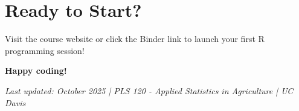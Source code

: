 \documentclass[11pt,a4paper]{article}
\begin{document}
\section{Ready to Start?}

Visit the course website or click the Binder link to launch your first R programming session!

\begin{center}
\textbf{Happy coding!}
\end{center}

\vfill

\begin{center}
\textit{Last updated: October 2025 | PLS 120 - Applied Statistics in Agriculture | UC Davis}
\end{center}
\end{document}
